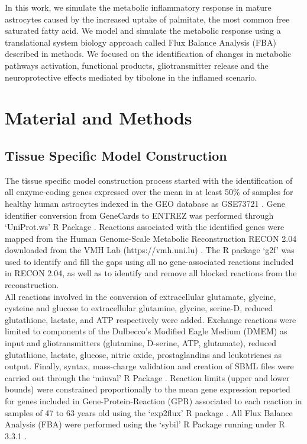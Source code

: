 In this work, we simulate the metabolic inflammatory response in mature astrocytes caused by the increased uptake of palmitate, the most common free saturated fatty acid. We model and simulate the metabolic response using a translational system biology approach called Flux Balance Analysis (FBA) described in methods. We focused on the identification of changes in metabolic pathways activation, functional products, gliotransmitter release and the neuroprotective effects mediated by tibolone in the inflamed scenario.
\section{Material and Methods}
\subsection*{Tissue Specific Model Construction}
The tissue specific model construction process started with the identification of all enzyme‐coding genes expressed over the mean in at least 50\% of samples for healthy human astrocytes indexed in the GEO database \cite{Edgar2002} as GSE73721 \citep{Zhang2016}. Gene identifier conversion from GeneCards\cite{rebhan1997genecards} to ENTREZ \cite{maglott2005entrez} was performed through `UniProt.ws' R Package \cite{Carlson2016}. Reactions associated with the identified genes were mapped from the Human Genome-Scale  Metabolic Reconstruction RECON 2.04 downloaded from the VMH Lab (https://vmh.uni.lu) \cite{thiele2013community}. The R package `g2f' \cite{G2F} was used to identify and fill the gaps using all no gene-associated reactions included in RECON 2.04, as well as to identify and remove all blocked reactions  from the reconstruction.\\

All reactions involved in the conversion of extracellular glutamate, glycine, cysteine and glucose to extracellular glutamine, glycine, serine-D, reduced glutathione, lactate, and ATP respectively were added. Exchange reactions were limited to components of the Dulbecco's Modified Eagle Medium (DMEM) as input and gliotransmitters (glutamine, D-serine, ATP, glutamate), reduced glutathione, lactate, glucose, nitric oxide, prostaglandins and leukotrienes as output. Finally, syntax, mass-charge validation and creation of SBML files were carried out through the `minval' R Package \cite{MINVAL}. Reaction limits (upper and lower bounds) were constrained proportionally to the mean gene expression reported for genes included in Gene-Protein-Reaction (GPR) \cite{Thiele2010} associated to each reaction in samples of 47 to 63 years old using the `exp2flux' R package \cite{EXP2FLUX}. All Flux Balance Analysis (FBA) were performed using the `sybil' \cite{Gelius-Dietrich2013} R Package running under R 3.3.1 \cite{RCoreTeam2016}.
